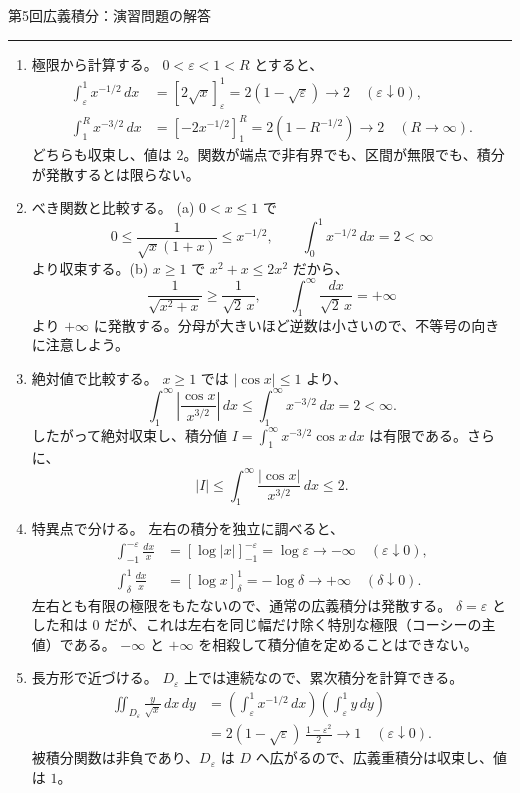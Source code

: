 \documentclass[a4paper,10pt,pdflatex,ja=standard,jafont=ipaex-type1,
  magstyle=real,scale=1]{bxjsarticle}
\newcommand{\handouttitle}[1]{%
  \begin{center}
    {\Large\color{ink}#1}\par\vspace{3mm}
    {\color{accent}\rule{0.88\linewidth}{0.7pt}}
  \end{center}\vspace{-2mm}}
\newcommand{\examplelabel}[1]{{\sffamily\mdseries\color{ink}#1}}
\newenvironment{problems}
  {\begin{enumerate}[leftmargin=2em,itemsep=6pt,topsep=3pt,parsep=0pt,
    font=\color{accent}]}
  {\end{enumerate}}
\begin{document}
\fontsize{10pt}{13.5pt}\selectfont
\setlength{\abovedisplayskip}{4pt}
\setlength{\belowdisplayskip}{4pt}
\setlength{\abovedisplayshortskip}{3pt}
\setlength{\belowdisplayshortskip}{4pt}
\handouttitle{第5回\quad 広義積分：演習問題の解答}
\begin{problems}
\item \examplelabel{極限から計算する。}
$0<\varepsilon<1<R$ とすると、
$$
 \begin{aligned}
 \int_\varepsilon^1x^{-1/2}\,dx
 &=[2\sqrt{x}]_\varepsilon^1=2(1-\sqrt\varepsilon)
 \longrightarrow2\quad(\varepsilon\downarrow0),\\
 \int_1^Rx^{-3/2}\,dx
 &=[-2x^{-1/2}]_1^R=2(1-R^{-1/2})
 \longrightarrow2\quad(R\to\infty).
 \end{aligned}
$$
どちらも収束し、値は $2$。関数が端点で非有界でも、区間が無限でも、積分が発散するとは限らない。

\item \examplelabel{べき関数と比較する。}
(a) $0<x\le1$ で
$$
 0\le\frac1{\sqrt{x}(1+x)}\le x^{-1/2},\qquad
 \int_0^1x^{-1/2}\,dx=2<\infty
$$
より収束する。(b) $x\ge1$ で $x^2+x\le2x^2$ だから、
$$
 \frac1{\sqrt{x^2+x}}\ge\frac1{\sqrt2\,x},\qquad
 \int_1^\infty\frac{dx}{\sqrt2\,x}=+\infty
$$
より $+\infty$ に発散する。分母が大きいほど逆数は小さいので、不等号の向きに注意しよう。

\item \examplelabel{絶対値で比較する。}
$x\ge1$ では $|\cos x|\le1$ より、
$$
 \int_1^\infty\left|\frac{\cos x}{x^{3/2}}\right|\,dx
 \le\int_1^\infty x^{-3/2}\,dx=2<\infty.
$$
したがって絶対収束し、積分値 $I=\int_1^\infty x^{-3/2}\cos x\,dx$ は有限である。さらに、
$$
 |I|\le\int_1^\infty\frac{|\cos x|}{x^{3/2}}\,dx\le2.
$$

\item \examplelabel{特異点で分ける。}
左右の積分を独立に調べると、
$$
 \begin{aligned}
 \int_{-1}^{-\varepsilon}\frac{dx}{x}
 &=[\log|x|]_{-1}^{-\varepsilon}=\log\varepsilon
 \longrightarrow-\infty\quad(\varepsilon\downarrow0),\\
 \int_\delta^1\frac{dx}{x}
 &=[\log x]_\delta^1=-\log\delta
 \longrightarrow+\infty\quad(\delta\downarrow0).
 \end{aligned}
$$
左右とも有限の極限をもたないので、通常の広義積分は発散する。
$\delta=\varepsilon$ とした和は $0$ だが、これは左右を同じ幅だけ除く特別な極限（コーシーの主値）である。
$-\infty$ と $+\infty$ を相殺して積分値を定めることはできない。

\item \examplelabel{長方形で近づける。}
$D_\varepsilon$ 上では連続なので、累次積分を計算できる。
$$
 \begin{aligned}
 \iint_{D_\varepsilon}\frac{y}{\sqrt{x}}\,dx\,dy
 &=\left(\int_\varepsilon^1x^{-1/2}\,dx\right)
   \left(\int_\varepsilon^1y\,dy\right)\\
 &=2(1-\sqrt\varepsilon)\,\frac{1-\varepsilon^2}{2}
 \longrightarrow1\quad(\varepsilon\downarrow0).
 \end{aligned}
$$
被積分関数は非負であり、$D_\varepsilon$ は $D$ へ広がるので、広義重積分は収束し、値は $1$。


\end{problems}
\end{document}
